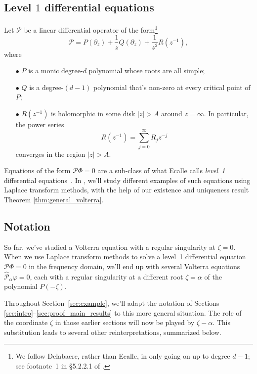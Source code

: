 \documentclass{article}
\theoremstyle{plain}
\begin{document}
\subsection{Level $1$ differential equations}\label{sec:level 1 ODE}
Let $\mathcal{P}$ be a linear differential operator of the form\footnote{ We follow Delabaere, rather than Ecalle, in only going on up to degree $d-1$; see footnote~1 in \S 5.2.2.1 of \cite{diverg-resurg-iii}.}
\[ \mathcal{P} = P(\partial_z) + \frac{1}{z} Q(\partial_z) + \frac{1}{z^2} R(z^{-1}), \]
where
\begin{enumerate}
\item[$\bullet$] $P$ is a monic degree-$d$ polynomial whose roots are all simple; 
\item[$\bullet$] $Q$ is a degree-$(d-1)$ polynomial that's non-zero at every critical point of $P$;
\item[$\bullet$] $R(z^{-1})$ is holomorphic in some disk $|z| > A$ around $z = \infty$. In particular, the power series
\[ R(z^{-1}) = \sum_{j=0}^\infty R_j z^{-j} \]
converges in the region $|z| > A$.
\end{enumerate}
Equations of the form $\mathcal{P}\Phi = 0$ are a sub-class of what Ecalle calls {\em level~1} differential equations~\cite[Section 2.1]{EcalleIII}. In \cite{borel_reg}, we'll study different examples of such equations using Laplace transform methods, with the help of our existence and uniqueness result Theorem \ref{thm:general_volterra}. 
\subsection{Notation}\label{sec:notation_alpha}
So far, we've studied a Volterra equation with a regular singularity at $\zeta = 0$. When we use Laplace transform methods to solve a level~1 differential equation $\mathcal{P}\Phi = 0$ in the frequency domain, we'll end up with several Volterra equations $\hat{\mathcal{P}}_\alpha \varphi = 0$, each with a regular singularity at a different root $\zeta = \alpha$ of the polynomial $P(-\zeta)$.

Throughout Section~\ref{sec:example}, we'll adapt the notation of Sections \ref{sec:intro}--\ref{sec:proof_main_results} to this more general situation. The role of the coordinate $\zeta$ in those earlier sections will now be played by $\zeta-\alpha$. This substitution leads to several other reinterpretations, summarized below.
\end{document}

